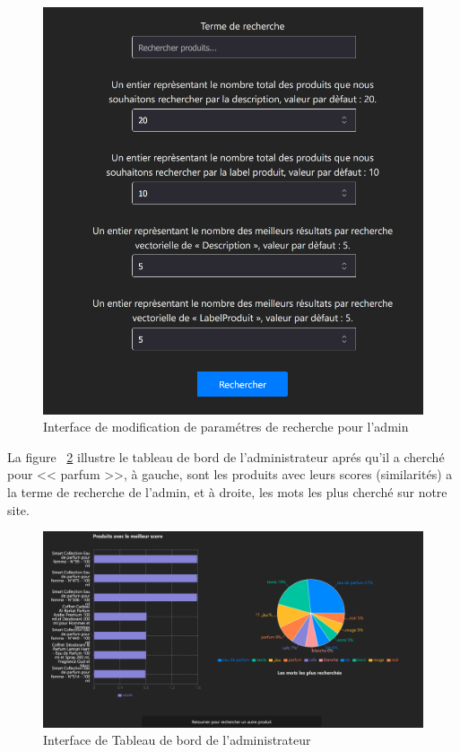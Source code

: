 \begin{figure}[H]
    \centering
    \includegraphics[width=1\textwidth]{logos/knnsearchform.png}
    \caption{Interface de modification de paramétres de recherche pour l'admin}
    \label{fig:knnsearchform}
\end{figure}


\noindent
La figure ~\ref{fig:admindashboard} illustre le tableau de bord de l'administrateur aprés qu'il a cherché pour  << parfum >>, à gauche, sont les produits avec leurs scores (similarités) a la terme de recherche de l'admin, et à droite, les mots les plus cherché sur notre site.

\begin{figure}[H]
    \centering
    \includegraphics[width=1\textwidth]{logos/dashboard.png}
    \caption{Interface de Tableau de bord de l'administrateur}
    \label{fig:admindashboard}
\end{figure}


